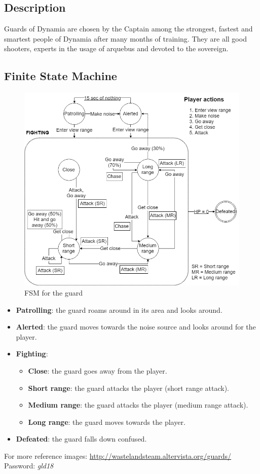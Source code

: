 \subsection{Description}
Guards of Dynamia are chosen by the Captain among the strongest, fastest and smartest people of Dynamia after many months of training. They are all good shooters, experts in the usage of arquebus and devoted to the sovereign.

\subsection{Finite State Machine}
\begin{figure}[H]
  \centering
  \includegraphics[width=\textwidth]{Images/Diagrams/FSMs/guardFSM}
  \caption{FSM for the guard}
\end{figure}

\begin{itemize}
	\item \textbf{Patrolling}: the guard roams around in its area and looks around.
	\item \textbf{Alerted}: the guard moves towards the noise source and looks around for the player.
	\item \textbf{Fighting}:
	\begin{itemize}
		\item \textbf{Close}: the guard goes away from the player.
		\item \textbf{Short range}: the guard attacks the player (short range attack).
		\item \textbf{Medium range}: the guard attacks the player (medium range attack).
		\item \textbf{Long range}: the guard moves towards the player.
	\end{itemize}
	\item \textbf{Defeated}: the guard falls down confused.
\end{itemize}

For more reference images: \url{http://wastelandsteam.altervista.org/guards/}\\
Password: \textit{gld18}
